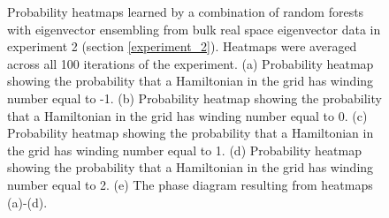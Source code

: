\documentclass[10pt]{revtex4-1}
\begin{document}
\begin{figure}
\caption{Probability heatmaps learned by a combination of random forests with eigenvector ensembling from bulk real space eigenvector data in experiment 2 (section \ref{experiment_2}). Heatmaps were averaged across all 100 iterations of the experiment. (a) Probability heatmap showing the probability that a Hamiltonian in the grid has winding number equal to -1.  (b) Probability heatmap showing the probability that a Hamiltonian in the grid has winding number equal to 0. (c) Probability heatmap showing the probability that a Hamiltonian in the grid has winding number equal to 1. (d) Probability heatmap showing the probability that a Hamiltonian in the grid has winding number equal to 2. (e) The phase diagram resulting from heatmaps (a)-(d).}
\label{ssh2_heatmaps}
\end{figure}
\end{document}
